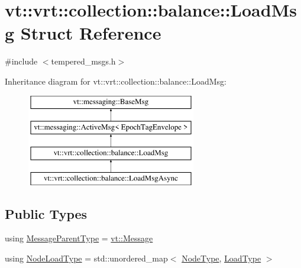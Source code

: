 \hypertarget{structvt_1_1vrt_1_1collection_1_1balance_1_1_load_msg}{}\section{vt\+:\+:vrt\+:\+:collection\+:\+:balance\+:\+:Load\+Msg Struct Reference}
\label{structvt_1_1vrt_1_1collection_1_1balance_1_1_load_msg}


{\ttfamily \#include $<$tempered\+\_\+msgs.\+h$>$}

Inheritance diagram for vt\+:\+:vrt\+:\+:collection\+:\+:balance\+:\+:Load\+Msg\+:\begin{figure}[H]
\begin{center}
\leavevmode
\includegraphics[height=4.000000cm]{structvt_1_1vrt_1_1collection_1_1balance_1_1_load_msg}
\end{center}
\end{figure}
\subsection*{Public Types}
\begin{DoxyCompactItemize}
\item 
using \hyperlink{structvt_1_1vrt_1_1collection_1_1balance_1_1_load_msg_a922095d2c2ceb7f192523defa012ca6d}{Message\+Parent\+Type} = \hyperlink{namespacevt_a3a3ddfef40b4c90915fa43cdd5f129ea}{vt\+::\+Message}
\item 
using \hyperlink{structvt_1_1vrt_1_1collection_1_1balance_1_1_load_msg_a573cc4f6cf58c3160e94a6351a3912d2}{Node\+Load\+Type} = std\+::unordered\+\_\+map$<$ \hyperlink{namespacevt_a866da9d0efc19c0a1ce79e9e492f47e2}{Node\+Type}, \hyperlink{namespacevt_a8fb51741340b87d7aaee0bef60e9896b}{Load\+Type} $>$
\end{DoxyCompactItemize}
